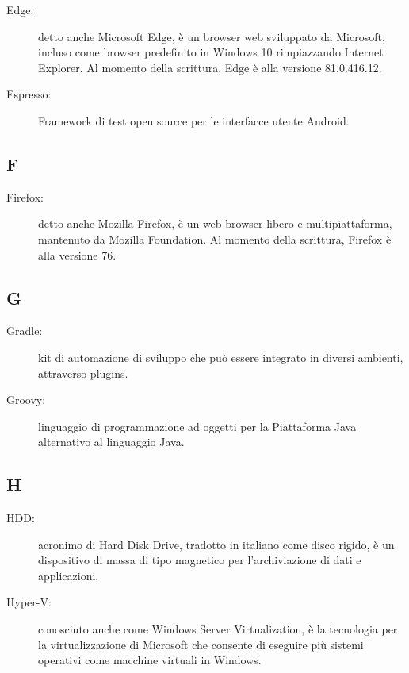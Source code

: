 \documentclass[../manuale-manutentore.tex]{subfiles}
\begin{document}
\begin{description}
  \item[Edge:] detto anche Microsoft Edge, è un browser web sviluppato da Microsoft, incluso come browser predefinito in Windows 10 rimpiazzando Internet Explorer. Al momento della scrittura, Edge è alla versione 81.0.416.12.
  \item[Espresso:] Framework di test open source per le interfacce utente Android.
\end{description}

\subsection{F}

\begin{description}
  \item[Firefox:] detto anche Mozilla Firefox, è un web browser libero e multipiattaforma, mantenuto da Mozilla Foundation. Al momento della scrittura, Firefox è alla versione 76.
\end{description}

\subsection{G}

\begin{description}
    \item[Gradle:] kit di automazione di sviluppo che può essere integrato in diversi ambienti, attraverso plugins.
    \item[Groovy:] linguaggio di programmazione ad oggetti per la Piattaforma Java alternativo al linguaggio Java.
\end{description}

\subsection{H}

\begin{description}
  \item[HDD:] acronimo di Hard Disk Drive, tradotto in italiano come disco rigido, è un dispositivo di massa di tipo magnetico per l'archiviazione di dati e applicazioni.
  \item[Hyper-V:] conosciuto anche come Windows Server Virtualization, è la tecnologia per la virtualizzazione di Microsoft che consente di eseguire più sistemi operativi come macchine virtuali in Windows.
\end{description}
\end{document}
